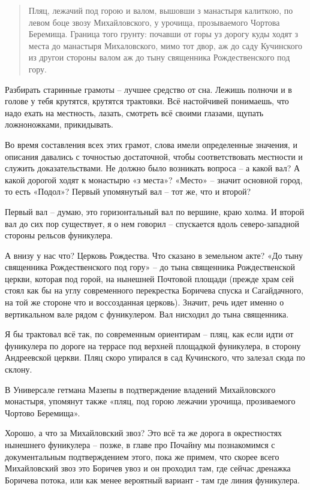 \begin{quotation}
Пляц, лежачий под горою и валом, вышовши з манастыря калиткою, по левом боце звозу Михайловского, у урочища, прозываемого Чортова Беремища. Граница того грунту: почавши от горы уз дорогу куды ходят з места до манастыря Михаловского, мимо тот двор, аж до саду Кучинского из другои стороны валом аж до тыну священника Рождественского под гору.
\end{quotation}

Разбирать старинные грамоты – лучшее средство от сна. Лежишь полночи и в голове у тебя крутятся, крутятся трактовки. Всё настойчивей понимаешь, что надо ехать на местность, лазать, смотреть всё своими глазами, щупать ложноножками, прикидывать.

Во время составления всех этих грамот, слова имели определенные значения, и описания давались с точностью достаточной, чтобы соответствовать местности и служить доказательствами. Не должно было возникать вопроса – а какой вал? А какой дорогой ходят к монастырю «з места»? «Место» – значит основной город, то есть «Подол»? Первый упомянутый вал – тот же, что и второй?

Первый вал – думаю, это горизонтальный вал по вершине, краю холма. И второй вал до сих пор существует, я о нем говорил – спускается вдоль северо-западной стороны рельсов фуникулера. 

А внизу у нас что? Церковь Рождества. Что сказано в земельном акте? «До тыну священника Рождественского под гору» – до тына священника Рождественской церкви, которая под горой, на нынешней Почтовой площади (прежде храм сей стоял как бы на углу современного перекрестка Боричева спуска и Сагайдачного, на той же стороне что и воссозданная церковь). Значит, речь идет именно о вертикальном вале рядом с фуникулером. Вал нисходил до тына священника.

Я бы трактовал всё так, по современным ориентирам – пляц, как если идти от фуникулера по дороге на террасе под верхней площадкой фуникулера, в сторону Андреевской церкви. Пляц скоро упирался в сад Кучинского, что залезал сюда по склону.

В Универсале гетмана Мазепы в подтверждение владений Михайловского монастыря, упомянут также «пляц, под горою лежачии урочища, прозиваемого Чортово Беремища».

Хорошо, а что за Михайловский звоз? Это всё та же дорога в окрестностях нынешнего фуникулера – позже, в главе про Почайну мы познакомимся с документальным подтверждением этого, пока же примем, что скорее всего Михайловский звоз это Боричев увоз и он проходил там, где сейчас дренажка Боричева потока, или как менее вероятный вариант - там где линия фуникулера.

